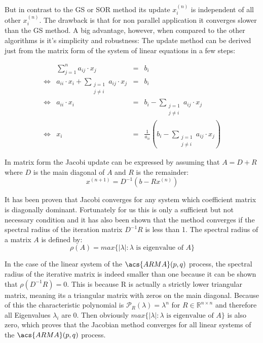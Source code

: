 But in contrast to the \acl{GS} or \acl{SOR} method its update $x_i^{(n)}$ is independent of all other $x_i^{(n)}$. The drawback is that for non parallel application it converges slower than the \acl{GS} method. A big advantage, however, when compared to the other algorithms is it's simplicity and robustness: The update method can be derived just from the matrix form of the system of linear equations in a few steps:\textsuperscript{\cite[p.~133]{Stroetmann2017IterativeGleichungs-Systeme}}
 
\begin{equation}\label{eq:derived_jacobi}
	\begin{array}{lrcl}
		&\displaystyle\sum_{j=1}^{n} a_{ij} \cdot x_j &=& b_i\\
        \Leftrightarrow & a_{ii} \cdot x_i + \displaystyle\sum_{\substack{j=1 \\ j\neq i}} a_{ij} \cdot x_j &=& b_i\\
        \Leftrightarrow & a_{ii} \cdot x_i  &=& b_i - \displaystyle\sum_{\substack{j=1 \\ j\neq i}} a_{ij} \cdot x_j\\
        \Leftrightarrow & x_i  &=& \frac{1}{a_{ii}} (b_i -  \displaystyle\sum_{\substack{j=1 \\ j\neq i}} a_{ij} \cdot x_j)
	\end{array}
\end{equation}

In matrix form the Jacobi update can be expressed by assuming that $A=D+R$ where $D$ is the main diagonal of $A$ and $R$ is the remainder:
\begin{equation}\label{eq:jacobi_update_matrix}
	x^{(n+1)} = D^{-1} (b - R x^{(n)})
\end{equation}

It has been proven that Jacobi converges for any system which coefficient matrix is diagonally dominant.\textsuperscript{\cite[p.~16]{JohnChapterSchemes}} Fortunately for us this is only a sufficient but not necessary condition and it has also been shown that the method converges if the spectral radius of the iteration matrix $D^{-1} R$ is less than 1. \textsuperscript{\cite[p.~12]{JohnChapterSchemes}} The spectral radius of a matrix $A$ is defined by:
\begin{equation}\label{eq:spectral_radius}
	\rho(A)=max\{|\lambda| : \lambda \textrm{ is eigenvalue of } A\}
\end{equation}

In the case of the linear system of the $\acs{ARMA}(p,q)$ process, the spectral radius of the iterative matrix is indeed smaller than one because it can be shown that $\rho(D^{-1} R)= 0$. This is because R is actually a strictly lower triangular matrix, meaning its a triangular matrix with zeros on the main diagonal. Because of this the characteristic polynomial is $\mathcal{P}_R (\lambda)=\lambda^n$ for $R \in \mathbb{R}^{n \times n}$ and therefore all Eigenvalues $\lambda_i$ are 0. Then obviously $max\{|\lambda| : \lambda \textrm{ is eigenvalue of } A\}$ is also zero, which proves that the Jacobian method converges for all linear systems of the $\acs{ARMA}(p,q)$ process.

